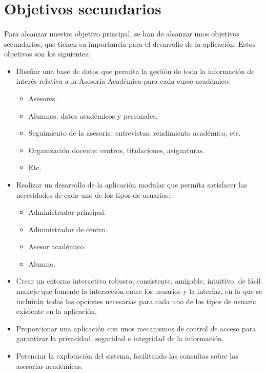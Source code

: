 \section{Objetivos secundarios}

\paragraph{}Para alcanzar nuestro objetivo principal, se han de alcanzar unos
objetivos secundarios, que tienen su importancia para el desarrollo de la
aplicación. Estos objetivos son los siguientes:

\begin{itemize}
   \item Diseñar una base de datos que permita la gestión de toda la información
         de interés relativa a la Asesoría Académica para cada curso académico:
   \begin{itemize}
      \item Asesores.
      \item Alumnos: datos académicos y personales.
      \item Seguimiento de la asesoría: entrevistas, rendimiento académico, etc.
      \item Organización docente: centros, titulaciones, asignaturas.
      \item Etc.
   \end{itemize}

   \item Realizar un desarrollo de la aplicación modular que permita satisfacer
         las necesidades de cada uno de los tipos de usuarios:
   \begin{itemize}
      \item Administrador principal.
      \item Administrador de centro.
      \item Asesor académico.
      \item Alumno.
   \end{itemize}

   \item Crear un entorno interactivo robusto, consistente, amigable, intuitivo,
         de fácil manejo que fomente la interacción entre los usuarios y la
         interfaz, en la que se incluirán todas las opciones necesarias para
         cada uno de los tipos de usuario existente en la aplicación.

   \item Proporcionar una aplicación con unos mecanismos de control de acceso
         para garantizar la privacidad, seguridad e integridad de la
         información.

   \item Potenciar la explotación del sistema, facilitando las consultas sobre
         las asesorías académicas.
\end{itemize}


